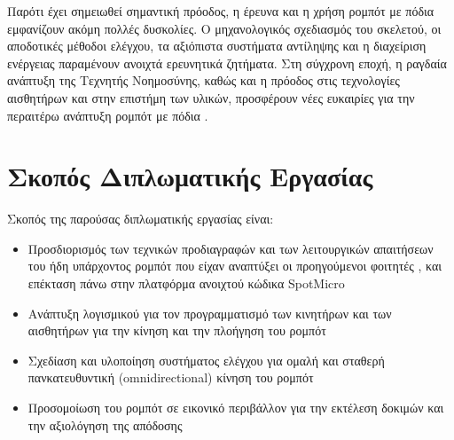 \documentclass[11pt]{report}
\begin{document}
Παρότι έχει σημειωθεί σημαντική πρόοδος, η έρευνα και η χρήση ρομπότ με πόδια
εμφανίζουν ακόμη πολλές δυσκολίες. Ο μηχανολογικός σχεδιασμός του σκελετού, οι
αποδοτικές μέθοδοι ελέγχου, τα αξιόπιστα συστήματα αντίληψης και η διαχείριση
ενέργειας παραμένουν ανοιχτά ερευνητικά ζητήματα. Στη σύγχρονη εποχή, η ραγδαία
ανάπτυξη της Τεχνητής Νοημοσύνης, καθώς και η πρόοδος στις τεχνολογίες
αισθητήρων και στην επιστήμη των υλικών, προσφέρουν νέες ευκαιρίες για την
περαιτέρω ανάπτυξη ρομπότ με πόδια \cite{li_quadruped_2025}.


\section{Σκοπός Διπλωματικής Εργασίας}
Σκοπός της παρούσας διπλωματικής εργασίας είναι:
\begin{itemize}
  \item Προσδιορισμός των τεχνικών προδιαγραφών και των λειτουργικών απαιτήσεων
  του ήδη υπάρχοντος ρομπότ που είχαν αναπτύξει οι προηγούμενοι φοιτητές
  \cite{tsiatsianas_quadruped_2024}, και επέκταση πάνω στην πλατφόρμα ανοιχτού
  κώδικα SpotMicro \cite{spotmicroai_project,kim_spotmicro_2019,taibo_spotmicro_2020}
  \item Ανάπτυξη λογισμικού για τον προγραμματισμό των κινητήρων και των
  αισθητήρων για την κίνηση και την πλοήγηση του ρομπότ
  \item Σχεδίαση και υλοποίηση συστήματος ελέγχου για ομαλή και σταθερή
  πανκατευθυντική (\foreignlanguage{english}{omnidirectional}) κίνηση του ρομπότ
  \item Προσομοίωση του ρομπότ σε εικονικό περιβάλλον για την εκτέλεση δοκιμών
  και την αξιολόγηση της απόδοσης
\end{itemize}
\end{document}
